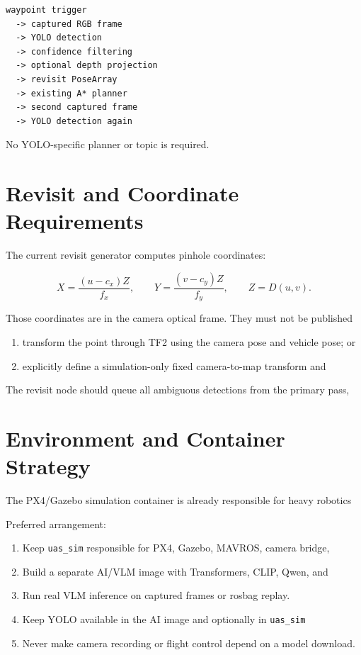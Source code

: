 \documentclass[11pt,a4paper]{article}
\newcommand{\code}[1]{\texttt{\small #1}}
\begin{document}
\begin{verbatim}
waypoint trigger
  -> captured RGB frame
  -> YOLO detection
  -> confidence filtering
  -> optional depth projection
  -> revisit PoseArray
  -> existing A* planner
  -> second captured frame
  -> YOLO detection again
\end{verbatim}

No YOLO-specific planner or topic is required.

\section{Revisit and Coordinate Requirements}

The current revisit generator computes pinhole coordinates:

\begin{equation}
X = \frac{(u-c_x)Z}{f_x}, \qquad
Y = \frac{(v-c_y)Z}{f_y}, \qquad
Z = D(u,v).
\end{equation}

Those coordinates are in the camera optical frame. They must not be published

\begin{enumerate}[leftmargin=1.2cm]
\item transform the point through TF2 using the camera pose and vehicle pose;
or
\item explicitly define a simulation-only fixed camera-to-map transform and
\end{enumerate}

The revisit node should queue all ambiguous detections from the primary pass,

\section{Environment and Container Strategy}

The PX4/Gazebo simulation container is already responsible for heavy robotics

Preferred arrangement:

\begin{enumerate}[leftmargin=1.2cm]
\item Keep \code{uas\_sim} responsible for PX4, Gazebo, MAVROS, camera bridge,
\item Build a separate AI/VLM image with Transformers, CLIP, Qwen, and
\item Run real VLM inference on captured frames or rosbag replay.
\item Keep YOLO available in the AI image and optionally in \code{uas\_sim}
\item Never make camera recording or flight control depend on a model download.
\end{enumerate}
\end{document}
